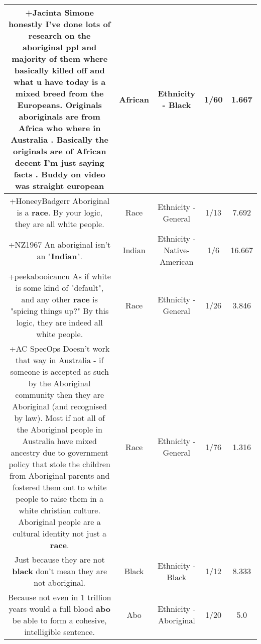 \documentclass[11pt]{article}
\newlength\mylength
\begin{document}
\begin{center}
\begin{longtable}{|C{.65\mylength}|C{.30\mylength}|C{.12\mylength}|C{.12\mylength}|C{.12\mylength}|}
  \small +Jacinta Simone honestly I've done lots of research on the aboriginal ppl and majority of them where basically killed off and what u have today is a mixed breed from the Europeans. Originals aboriginals are from Africa who where in Australia . Basically the originals are of \textbf{African} decent I'm just saying facts . Buddy on video was straight european\normalsize   & African & Ethnicity - Black & 1/60 & 1.667 \\  \hline
  \small +HoneeyBadgerr Aboriginal is a \textbf{race}. By your logic, they are all white people.\normalsize   & Race & Ethnicity - General & 1/13 & 7.692 \\  \hline
  \small +NZ1967 An aboriginal isn't an "\textbf{Indian}".\normalsize   & Indian & Ethnicity - Native-American & 1/6 & 16.667 \\  \hline
  \small +peekabooicancu As if white is some kind of "default", and any other \textbf{race} is "spicing things up?" By this logic, they are indeed all white people.\normalsize   & Race & Ethnicity - General & 1/26 & 3.846 \\  \hline
  \small +AC SpecOps Doesn't work that way in Australia - if someone is accepted as such by the Aboriginal community then they are Aboriginal (and recognised by law). Most if not all of the Aboriginal people in Australia have mixed ancestry due to government policy that stole the children from Aboriginal parents and fostered them out to white people to raise them in a white christian culture. Aboriginal people are a cultural identity not just a \textbf{race}.\normalsize   & Race & Ethnicity - General & 1/76 & 1.316 \\  \hline
  \small Just because they are not \textbf{black} don't mean they are not aboriginal.\normalsize   & Black & Ethnicity - Black & 1/12 & 8.333 \\  \hline
  \small Because not even in 1 trillion years would a full blood \textbf{abo} be able to form a cohesive, intelligible sentence.\normalsize   & Abo & Ethnicity - Aboriginal & 1/20 & 5.0 \\  \hline

\end{longtable}
\end{center}
\end{document}
